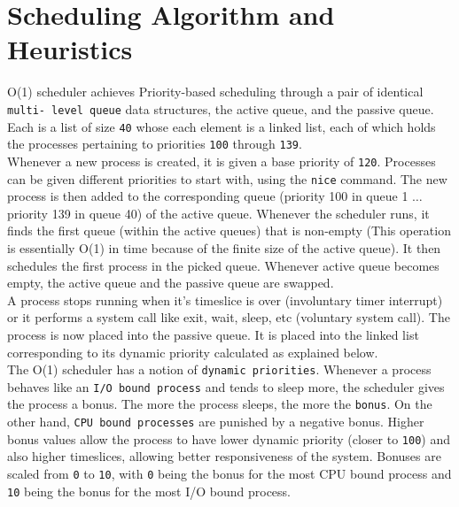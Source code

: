 \documentclass[11pt]{article}
\begin{document}
\section{Scheduling Algorithm and Heuristics}
\hspace{10mm} O(1) scheduler achieves Priority-based scheduling through a pair of identical \texttt{multi- level queue} data structures, the active queue, and the passive queue. Each is a list of size \texttt{40} whose each element is a linked list, each of which holds the processes pertaining to priorities \texttt{100} through \texttt{139}.\\

\vspace{2.5mm}
\hspace{10mm} Whenever a new process is created, it is given a base priority of \texttt{120}. Processes can be given different priorities to start with, using the \texttt{nice} command. The new process is then added to the corresponding queue (priority 100 in queue 1 $\dots$ priority 139 in queue 40) of the active queue. Whenever the scheduler runs, it finds the first queue (within the active queues) that is non-empty (This operation is essentially O(1) in time because of the finite size of the active queue). It then schedules the first process in the picked queue. Whenever active queue becomes empty, the active queue and the passive queue are swapped.\\

\vspace{2.5mm}
\hspace{10mm} A process stops running when it's timeslice is over (involuntary timer interrupt) or it performs a system call like exit, wait, sleep, etc (voluntary system call). The process is now placed into the passive queue. It is placed into the linked list corresponding to its dynamic priority calculated as explained below.\\

\vspace{2.5mm}
\hspace{10mm} The O(1) scheduler has a notion of \texttt{dynamic priorities}. Whenever a process behaves like an \texttt{I/O bound process} and tends to sleep more, the scheduler gives the process a bonus. The more the process sleeps, the more the \texttt{bonus}. On the other hand, \texttt{CPU bound processes} are punished by a negative bonus. Higher bonus values allow the process to have lower dynamic priority (closer to \texttt{100}) and also higher timeslices, allowing better responsiveness of the system. Bonuses are scaled from \texttt{0} to \texttt{10}, with \texttt{0} being the bonus for the most CPU bound process and \texttt{10} being the bonus for the most I/O bound process.\\
\end{document}
